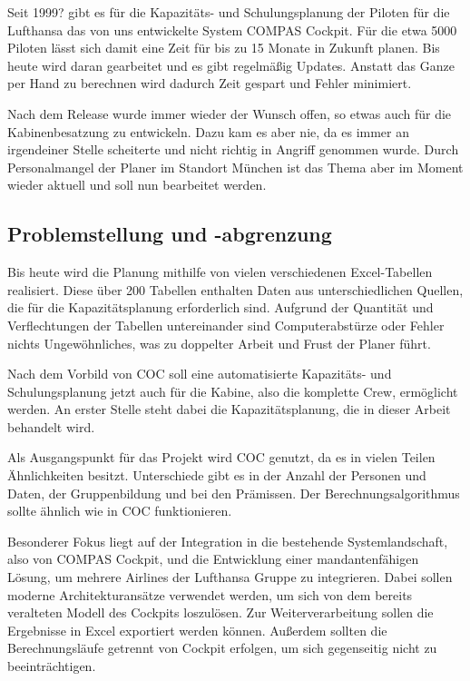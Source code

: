\documentclass [12pt, a4paper, oneside, titlepage, ngerman]{article}
\begin{document}
\noindent Seit 1999? gibt es für die Kapazitäts- und Schulungsplanung der Piloten für die Lufthansa das von uns entwickelte System COMPAS Cockpit. Für die etwa 5000 Piloten lässt sich damit eine Zeit für bis zu 15 Monate in Zukunft planen. Bis heute wird daran gearbeitet und es gibt regelmäßig Updates. Anstatt das Ganze per Hand zu berechnen wird dadurch Zeit gespart und Fehler minimiert.

\noindent Nach dem Release wurde immer wieder der Wunsch offen, so etwas auch für die Kabinenbesatzung zu entwickeln. Dazu kam es aber nie, da es immer an irgendeiner Stelle scheiterte und nicht richtig in Angriff genommen wurde. Durch Personalmangel der Planer im Standort München ist das Thema aber im Moment wieder aktuell und soll nun bearbeitet werden.

\subsection {Problemstellung und -abgrenzung}
Bis heute wird die Planung mithilfe von vielen verschiedenen Excel-Tabellen realisiert. Diese über 200 Tabellen enthalten Daten aus unterschiedlichen Quellen, die für die Kapazitätsplanung erforderlich sind. Aufgrund der Quantität und Verflechtungen der Tabellen untereinander sind Computerabstürze oder Fehler nichts Ungewöhnliches, was zu doppelter Arbeit und Frust der Planer führt.

\noindent Nach dem Vorbild von COC soll eine automatisierte Kapazitäts- und Schulungsplanung jetzt auch für die Kabine, also die komplette Crew, ermöglicht werden. An erster Stelle steht dabei die Kapazitätsplanung, die in dieser Arbeit behandelt wird.

\noindent Als Ausgangspunkt für das Projekt wird COC genutzt, da es in vielen Teilen Ähnlichkeiten besitzt. Unterschiede gibt es in der Anzahl der Personen und Daten, der Gruppenbildung und bei den Prämissen. Der Berechnungsalgorithmus sollte ähnlich wie in COC funktionieren. 

\noindent Besonderer Fokus liegt auf der Integration in die bestehende Systemlandschaft, also von COMPAS Cockpit, und die Entwicklung einer mandantenfähigen Lösung, um mehrere Airlines der Lufthansa Gruppe zu integrieren. Dabei sollen moderne Architekturansätze verwendet werden, um sich von dem bereits veralteten Modell des Cockpits loszulösen.
Zur Weiterverarbeitung sollen die Ergebnisse in Excel exportiert werden können. Außerdem sollten die Berechnungsläufe getrennt von Cockpit erfolgen, um sich gegenseitig nicht zu beeinträchtigen.
\end{document}
